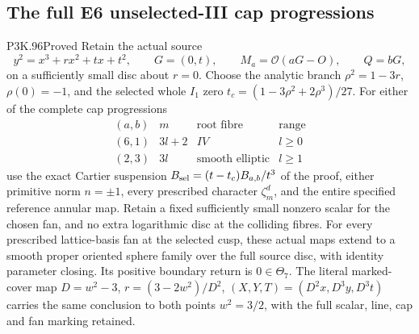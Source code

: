 \subsection{The full E6 unselected-III cap progressions}
\begin{statement}{P3K.96}{Proved}
Retain the actual source
\[
 y^2=x^3+r x^2+t x+t^2,\qquad G=(0,t),\qquad
 M_a=\mathcal O(aG-O),\qquad Q=bG,
\]
on a sufficiently small disc about \(r=0\). Choose the analytic branch
\(\rho^2=1-3r\), \(\rho(0)=-1\), and the selected whole
\(I_1\) zero \(t_c=(1-3\rho^2+2\rho^3)/27\). For either of the
complete cap progressions
\[
\begin{array}{c|c|c|c}
(a,b)&m&\text{root fibre}&\text{range}\\\hline
(6,1)&3l+2&IV&l\ge0\\
(2,3)&3l&\text{smooth elliptic}&l\ge1
\end{array}
\]
use the exact Cartier suspension
\(B_{\rm sel}=(t-t_c)B_{a,b}/t^3\) of the proof, either primitive
norm \(n=\pm1\), every prescribed character \(\zeta_m^d\), and
the entire specified reference annular map. Retain a fixed sufficiently
small nonzero scalar for the chosen fan, and no extra logarithmic disc
at the colliding fibres. For every prescribed lattice-basis fan at the
selected cusp, these actual maps extend to a smooth proper oriented
sphere family over the full source disc, with identity parameter
closing. Its positive boundary return is \(0\in\Theta_7\).
The literal marked-cover map \(D=w^2-3\),
\(r=(3-2w^2)/D^2\), \((X,Y,T)=(D^2x,D^3y,D^3t)\)
carries the same conclusion to both points \(w^2=3/2\), with the
full scalar, line, cap and fan marking retained.
\end{statement}
